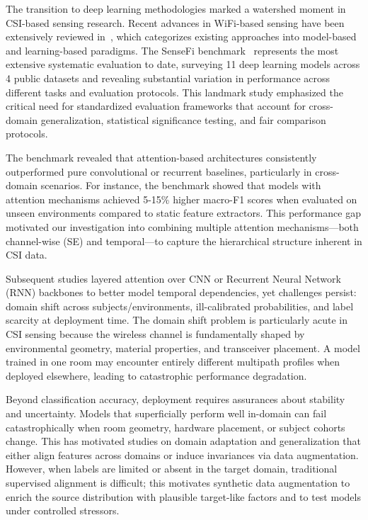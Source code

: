 \documentclass[lettersize,journal]{IEEEtran}
\begin{document}
The transition to deep learning methodologies marked a watershed moment in CSI-based sensing research. Recent advances in WiFi-based sensing have been extensively reviewed in~\cite{ma2019wifi}, which categorizes existing approaches into model-based and learning-based paradigms. The SenseFi benchmark~\cite{yang2023sensefi} represents the most extensive systematic evaluation to date, surveying 11 deep learning models across 4 public datasets and revealing substantial variation in performance across different tasks and evaluation protocols. This landmark study emphasized the critical need for standardized evaluation frameworks that account for cross-domain generalization, statistical significance testing, and fair comparison protocols.

The benchmark revealed that attention-based architectures consistently outperformed pure convolutional or recurrent baselines, particularly in cross-domain scenarios. For instance, the benchmark showed that models with attention mechanisms achieved 5-15\% higher macro-F1 scores when evaluated on unseen environments compared to static feature extractors. This performance gap motivated our investigation into combining multiple attention mechanisms—both channel-wise (SE) and temporal—to capture the hierarchical structure inherent in CSI data.

Subsequent studies layered attention over CNN or Recurrent Neural Network (RNN) backbones to better model temporal dependencies, yet challenges persist: domain shift across subjects/environments, ill-calibrated probabilities, and label scarcity at deployment time. The domain shift problem is particularly acute in CSI sensing because the wireless channel is fundamentally shaped by environmental geometry, material properties, and transceiver placement. A model trained in one room may encounter entirely different multipath profiles when deployed elsewhere, leading to catastrophic performance degradation.

Beyond classification accuracy, deployment requires assurances about stability and uncertainty. Models that superficially perform well in-domain can fail catastrophically when room geometry, hardware placement, or subject cohorts change. This has motivated studies on domain adaptation and generalization that either align features across domains or induce invariances via data augmentation. However, when labels are limited or absent in the target domain, traditional supervised alignment is difficult; this motivates synthetic data augmentation to enrich the source distribution with plausible target-like factors and to test models under controlled stressors.
\end{document}
